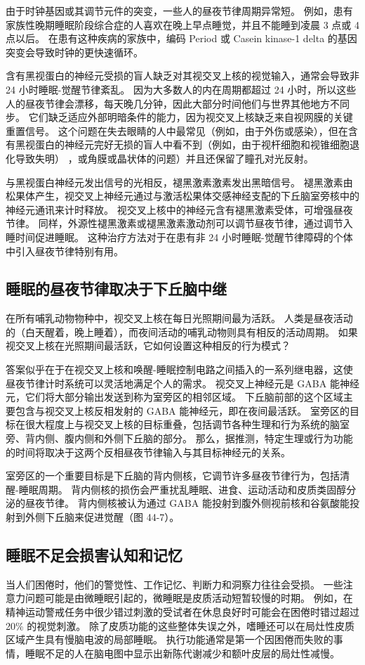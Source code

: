 由于时钟基因或其调节元件的突变，一些人的昼夜节律周期异常短。 例如，患有家族性晚期睡眠阶段综合症的人喜欢在晚上早点睡觉，并且不能睡到凌晨 3 点或 4 点以后。 在患有这种疾病的家族中，编码 Period 或 Casein kinase-1 delta 的基因突变会导致时钟的更快速循环。

含有黑视蛋白的神经元受损的盲人缺乏对其视交叉上核的视觉输入，通常会导致非 24 小时睡眠-觉醒节律紊乱。 因为大多数人的内在周期都超过 24 小时，所以这些人的昼夜节律会漂移，每天晚几分钟，因此大部分时间他们与世界其他地方不同步。 它们缺乏适应外部明暗条件的能力，因为视交叉上核缺乏来自视网膜的关键重置信号。 这个问题在失去眼睛的人中最常见（例如，由于外伤或感染），但在含有黑视蛋白的神经元完好无损的盲人中看不到（例如，由于视杆细胞和视锥细胞退化导致失明） ，或角膜或晶状体的问题）并且还保留了瞳孔对光反射。

与黑视蛋白神经元发出信号的光相反，褪黑激素激素发出黑暗信号。 褪黑激素由松果体产生，视交叉上神经元通过与激活松果体交感神经支配的下丘脑室旁核中的神经元通讯来计时释放。 视交叉上核中的神经元含有褪黑激素受体，可增强昼夜节律。 同样，外源性褪黑激素或褪黑激素激动剂可以调节昼夜节律，通过调节入睡时间促进睡眠。 这种治疗方法对于在患有非 24 小时睡眠-觉醒节律障碍的个体中引入昼夜节律特别有用。

\subsection{睡眠的昼夜节律取决于下丘脑中继}
在所有哺乳动物物种中，视交叉上核在每日光照期间最为活跃。 人类是昼夜活动的（白天醒着，晚上睡着），而夜间活动的哺乳动物则具有相反的活动周期。 如果视交叉上核在光照期间最活跃，它如何设置这种相反的行为模式？

答案似乎在于在视交叉上核和唤醒-睡眠控制电路之间插入的一系列继电器，这使昼夜节律计时系统可以灵活地满足个人的需求。 视交叉上神经元是 GABA 能神经元，它们将大部分输出发送到称为室旁区的相邻区域。 下丘脑前部的这个区域主要包含与视交叉上核反相发射的 GABA 能神经元，即在夜间最活跃。 室旁区的目标在很大程度上与视交叉上核的目标重叠，包括调节各种生理和行为系统的脑室旁、背内侧、腹内侧和外侧下丘脑的部分。 那么，据推测，特定生理或行为功能的时间将取决于这两个反相昼夜节律输入与其目标神经元的关系。

室旁区的一个重要目标是下丘脑的背内侧核，它调节许多昼夜节律行为，包括清醒-睡眠周期。 背内侧核的损伤会严重扰乱睡眠、进食、运动活动和皮质类固醇分泌的昼夜节律。 背内侧核被认为通过 GABA 能投射到腹外侧视前核和谷氨酸能投射到外侧下丘脑来促进觉醒（图 44-7）。

\subsection{睡眠不足会损害认知和记忆}
当人们困倦时，他们的警觉性、工作记忆、判断力和洞察力往往会受损。 一些注意力问题可能是由微睡眠引起的，微睡眠是皮质活动短暂较慢的时期。 例如，在精神运动警戒任务中很少错过刺激的受试者在休息良好时可能会在困倦时错过超过 20\% 的视觉刺激。 除了皮质功能的这些整体失误之外，嗜睡还可以在局灶性皮质区域产生具有慢脑电波的局部睡眠。 执行功能通常是第一个因困倦而失败的事情，睡眠不足的人在脑电图中显示出新陈代谢减少和额叶皮层的局灶性减慢。

